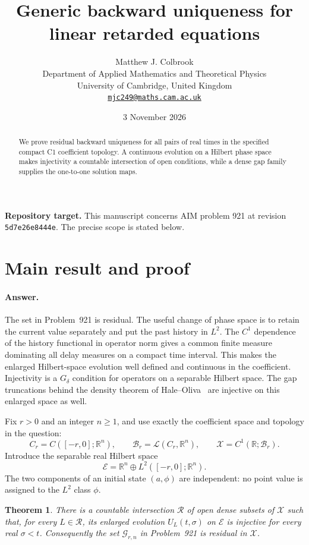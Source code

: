 \documentclass[11pt,a4paper]{article}
\title{\textbf{Generic backward uniqueness for linear retarded equations}}
\author{Matthew J. Colbrook\\[3pt]
{\small Department of Applied Mathematics and Theoretical Physics}\\
{\small University of Cambridge, United Kingdom}\\
{\small\href{mailto:mjc249@maths.cam.ac.uk}{\texttt{mjc249@maths.cam.ac.uk}}}}
\date{3 November 2026}
\newtheorem{theorem}{Theorem}[section]
\theoremstyle{remark}
\begin{document}
\maketitle
\begin{abstract}
We prove residual backward uniqueness for all pairs of real times in the specified compact C1 coefficient topology. A continuous evolution on a Hilbert phase space makes injectivity a countable intersection of open conditions, while a dense gap family supplies the one-to-one solution maps.
\end{abstract}
\noindent\textbf{Repository target.}
This manuscript concerns AIM problem 921 at revision
\texttt{5d7e26e8444e}. The precise scope is stated below.
\medskip

\section{Main result and proof}
\label{sec:921}

\paragraph{Answer.} The set in Problem~921 is residual. The useful change
of phase space is to retain the current value separately and put the past
history in $L^2$. The $C^1$ dependence of the history functional in operator
norm gives a common finite measure dominating all delay measures on a
compact time interval. This makes the enlarged Hilbert-space evolution
well defined and continuous in the coefficient. Injectivity is a $G_\delta$
condition for operators on a separable Hilbert space. The gap truncations
behind the density theorem of Hale--Oliva~\cite{HaleOliva1976} are injective
on this enlarged space as well.

Fix $r>0$ and an integer $n\ge1$, and use exactly the coefficient space
and topology in the question:
\[
 C_r=C([-r,0];\mathbb R^n),\qquad
 \mathcal B_r=\mathcal L(C_r,\mathbb R^n),\qquad
 \mathcal X=C^1(\mathbb R;\mathcal B_r).
\]
Introduce the separable real Hilbert space
\[
 \mathcal E=\mathbb R^n\oplus L^2([-r,0];\mathbb R^n).
 \tag{921.1}\label{eq:921-hilbert-phase}
\]
The two components of an initial state $(a,\phi)$ are independent: no
point value is assigned to the $L^2$ class $\phi$.

\begin{theorem}\label{thm:921}
There is a countable intersection $\mathcal R$ of open dense subsets of
$\mathcal X$ such that, for every $L\in\mathcal R$, its enlarged evolution
$U_L(t,\sigma)$ on $\mathcal E$ is injective for every real $\sigma<t$.
Consequently the set $\mathcal G_{r,n}$ in Problem~921 is residual in
$\mathcal X$.
\end{theorem}
\end{document}
